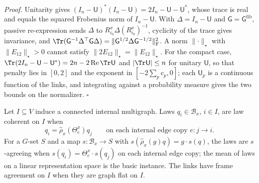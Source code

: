 \noindent\emph{Proof.}
Unitarity gives $(I_n-\mathsf U)^*(I_n-\mathsf U)=2I_n-\mathsf U-\mathsf U^*$, whose trace is real and
equals the squared Frobenius norm of $I_n-\mathsf U$. With $\Delta=I_n-\mathsf U$ and
$\mathsf G=\mathsf G^{\mathrm{fib}}$, passive re-expression sends $\Delta$ to
$R_{i_0}^x\Delta(R_{i_0}^x)^{-1}$, cyclicity of the trace gives invariance, and
$\Tr(\mathsf G^{-1}\Delta^\top\mathsf G\Delta)=\lVert\mathsf G^{1/2}\Delta\mathsf G^{-1/2}\rVert_{\mathrm F}^2$.
A norm $\lVert\cdot\rVert_\star$ with $\lVert E_{12}\rVert_\star>0$ cannot satisfy
$\lVert2E_{12}\rVert_\star=\lVert E_{12}\rVert_\star$. For the compact case,
$\Tr(2I_n-\mathsf U-\mathsf U^*)=2n-2\operatorname{Re}\Tr\mathsf U$ and $\lvert\Tr\mathsf U\rvert\leq n$
for unitary $\mathsf U$, so that penalty lies in $[0,2]$ and the exponent in $[-2\sum_p\mathrm c_p,0]$;
each $\mathsf U_p$ is a continuous function of the links, and integrating against a probability
measure gives the two bounds on the normalizer. \hfill$\square$

Let $I\subseteq V$ induce a connected internal multigraph. Laws $q_i\in\mathcal B_x$, $i\in I$, are law
coherent on $I$ when
\begin{equation}
q_i=\widehat\rho_x(\Theta_e^x)q_j
\qquad\text{on each internal edge copy }e:j\to i.
\label{eq:phil-law-coherence}
\end{equation}
For a $G$-set $S$ and a map $s:\mathcal B_x\to S$ with $s(\widehat\rho_x(g)q)=g\cdot s(q)$, the laws are
$s$-agreeing when $s(q_i)=\Theta_e^x\cdot s(q_j)$ on each internal edge copy; the mean of laws on a
linear representation space is the basic instance. The links have frame agreement on $I$ when they
are graph flat on $I$.

